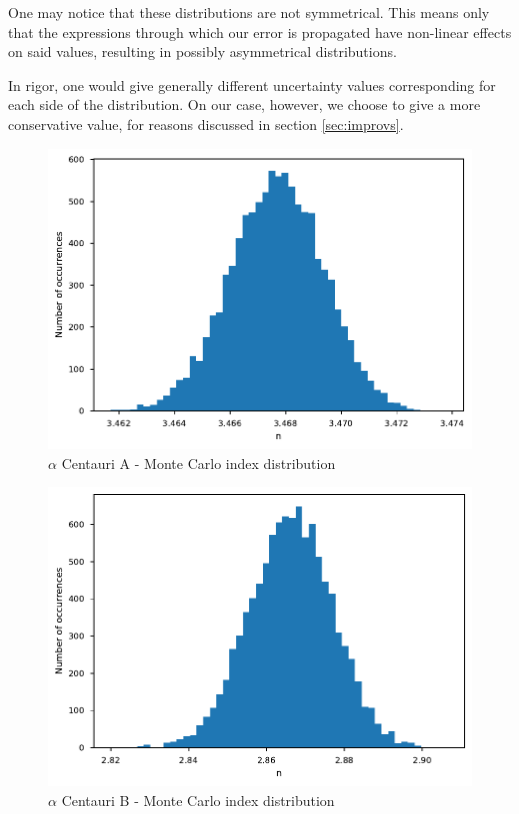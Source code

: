 \documentclass{aa}
\begin{document}
One may notice that these distributions are not symmetrical. This means only
that the expressions through which our error is propagated have non-linear
effects on said values, resulting in possibly asymmetrical distributions.

In rigor, one would give generally different uncertainty values corresponding for each side of
the distribution. On our case, however, we choose to give a more conservative
value, for reasons discussed in section \ref{sec:improvs}.

\begin{figure}
  \centering
  \includegraphics[width=\linewidth]{../figures/alpha_a_10k.pdf}
  \caption{$\alpha$ Centauri A - Monte Carlo index distribution}
  \label{fig:mc_alpha_a}
\end{figure}
\begin{figure}
  \centering
  \includegraphics[width=\linewidth]{../figures/alpha_b_10k.pdf}
  \caption{$\alpha$ Centauri B - Monte Carlo index distribution}
  \label{fig:mc_alpha_b}
\end{figure}
\end{document}
